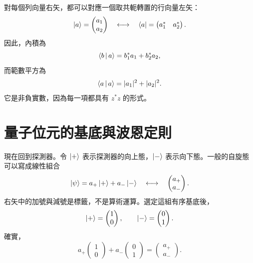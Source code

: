 對每個列向量右矢，都可以對應一個取共軛轉置的行向量左矢：
\begin{equation}
  \left\lvert a\right\rangle=
  \begin{pmatrix}a_1\\a_2\end{pmatrix}
  \quad\longleftrightarrow\quad
  \left\langle a\right\rvert=
  \begin{pmatrix}a_1^*&a_2^*\end{pmatrix}.
  \label{eq:l02-bra-ket-components}
\end{equation}
因此，內積為
\begin{equation}
  \left\langle b\,\middle|\,a\right\rangle=b_1^*a_1+b_2^*a_2,
  \label{eq:l02-inner-product}
\end{equation}
而範數平方為
\begin{equation}
  \left\langle a\,\middle|\,a\right\rangle=|a_1|^2+|a_2|^2.
  \label{eq:l02-norm}
\end{equation}
它是非負實數，因為每一項都具有 \(z^*z\) 的形式。

\begin{classroomqa}
\end{classroomqa}

\section{量子位元的基底與波恩定則}

現在回到探測器。令 \(\left\lvert+\right\rangle\) 表示探測器的向上態，\(\left\lvert-\right\rangle\) 表示向下態。一般的自旋態可以寫成線性組合
\begin{equation}
  \left\lvert\psi\right\rangle=a_+\left\lvert+\right\rangle+a_-\left\lvert-\right\rangle
  \quad\longleftrightarrow\quad
  \begin{pmatrix}a_+\\a_-\end{pmatrix}.
  \label{eq:l02-general-qubit}
\end{equation}
右矢中的加號與減號是標籤，不是算術運算。選定這組有序基底後，
\begin{equation}
  \left\lvert+\right\rangle=
  \begin{pmatrix}1\\0\end{pmatrix},
  \qquad
  \left\lvert-\right\rangle=
  \begin{pmatrix}0\\1\end{pmatrix}.
  \label{eq:l02-basis-columns}
\end{equation}
確實，
\begin{equation}
  a_+\begin{pmatrix}1\\0\end{pmatrix}
  +a_-\begin{pmatrix}0\\1\end{pmatrix}
  =
  \begin{pmatrix}a_+\\a_-\end{pmatrix}.
  \label{eq:l02-basis-expansion}
\end{equation}

